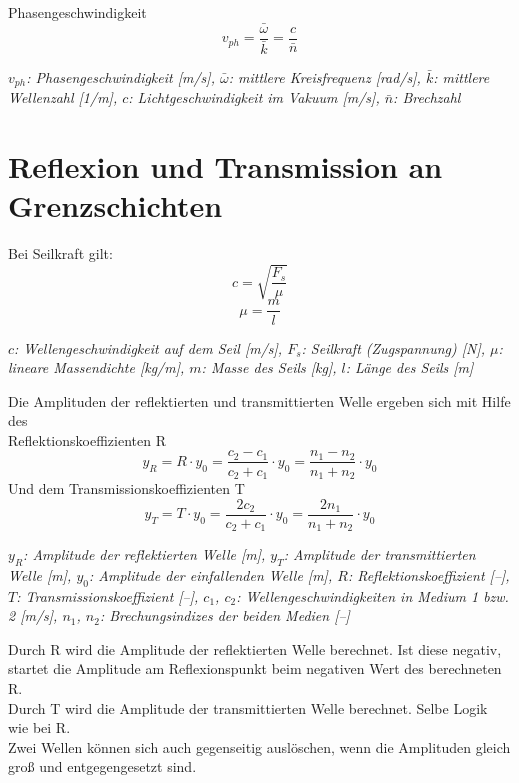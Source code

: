 \documentclass[a4paper,10pt]{article}
\newenvironment{displayformula}
{
	\begin{framed}
		\color{formulaColor}
	}
	{\end{framed}}
\newcommand{\formulalegend}[1]{%
	\par\vspace{0.5ex}%
	{{\color{legendColor}\RaggedRight\small\textit{#1}}}%
	\par\vspace{1.5ex}%
}
\begin{document}
\begin{displayformula}
		Phasengeschwindigkeit
	\[
	v_{ph} = \frac{\bar{ \omega}}{\bar{k}} = \frac{c}{\bar{n}}
	\]
\end{displayformula}
\formulalegend{
	\( v_{ph} \): Phasengeschwindigkeit [m/s], 
	\( \bar{\omega} \): mittlere Kreisfrequenz [rad/s], 
	\( \bar{k} \): mittlere Wellenzahl [1/m], 
	\( c \): Lichtgeschwindigkeit im Vakuum [m/s], 
	\( \bar{n} \): Brechzahl
}


\section{Reflexion und Transmission an Grenzschichten}

\begin{displayformula}
Bei Seilkraft gilt: 
	\[
	c = \sqrt{\frac{F_s}{\mu}}
	\]
	\[
	\mu = \frac{m}{l}
	\]
\end{displayformula}
\formulalegend{
	\( c \): Wellengeschwindigkeit auf dem Seil [m/s], 
	\( F_s \): Seilkraft (Zugspannung) [N], 
	\( \mu \): lineare Massendichte [kg/m], 
	\( m \): Masse des Seils [kg], 
	\( l \): Länge des Seils [m]
}


\begin{displayformula}
	Die Amplituden der reflektierten und transmittierten Welle ergeben sich mit Hilfe des \\ Reflektionskoeffizienten R
	\[
	y_R = R \cdot y_0 = \frac{c_2 - c_1}{c_2 + c_1} \cdot y_0 = \frac{n_1 - n_2}{n_1 + n_2} \cdot y_0
	\]
	Und dem Transmissionskoeffizienten T
	\[
	y_T = T \cdot y_0 = \frac{2c_2}{c_2 + c_1} \cdot y_0 = \frac{2n_1}{n_1 + n_2} \cdot y_0
	\]
\end{displayformula}
\formulalegend{
	\( y_R \): Amplitude der reflektierten Welle [m], 
	\( y_T \): Amplitude der transmittierten Welle [m], 
	\( y_0 \): Amplitude der einfallenden Welle [m], 
	\( R \): Reflektionskoeffizient [–], 
	\( T \): Transmissionskoeffizient [–], 
	\( c_1 \), \( c_2 \): Wellengeschwindigkeiten in Medium 1 bzw. 2 [m/s], 
	\( n_1 \), \( n_2 \): Brechungsindizes der beiden Medien [–]
}

Durch R wird die Amplitude der reflektierten Welle berechnet. Ist diese negativ, startet die Amplitude am Reflexionspunkt beim negativen Wert des berechneten R. \\
Durch T wird die Amplitude der transmittierten Welle berechnet. Selbe Logik wie bei R. \\
Zwei Wellen können sich auch gegenseitig auslöschen, wenn die Amplituden gleich groß und entgegengesetzt sind.
\end{document}
